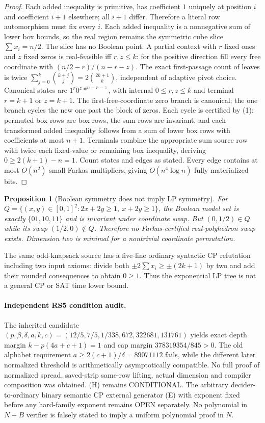 \documentclass[11pt]{article}
\newtheorem{proposition}[theorem]{Proposition}
\begin{document}
\begin{proof}
Each added inequality is primitive, has coefficient $1$ uniquely at position $i$ and coefficient $i+1$ elsewhere; all $i+1$ differ. Therefore a literal row automorphism must fix every $i$. Each added inequality is a nonnegative sum of lower box bounds, so the real region remains the symmetric cube slice $\sum x_i=n/2$. The slice has no Boolean point. A partial context with $r$ fixed ones and $z$ fixed zeros is real-feasible iff $r,z\le k$: for the positive direction fill every free coordinate with $(n/2-r)/(n-r-z)$. The exact first-passage count of leaves is twice $\sum_{j=0}^k\binom{k+j}{j}=2\binom{2k+1}{k}$, independent of adaptive pivot choice. Canonical states are $1^r0^z*^{n-r-z}$, with internal $0\le r,z\le k$ and terminal $r=k+1$ or $z=k+1$. The first-free-coordinate zero branch is canonical; the one branch cycles the new one past the block of zeros. Each cycle is certified by (1): permuted box rows are box rows, the sum rows are invariant, and each transformed added inequality follows from a sum of lower box rows with coefficients at most $n+1$. Terminals combine the appropriate sum source row with twice each fixed-value or remaining box inequality, deriving $0\ge 2(k+1)-n=1$. Count states and edges as stated. Every edge contains at most $O(n^2)$ small Farkas multipliers, giving $O(n^4\log n)$ fully materialized bits.
\end{proof}
\begin{proposition}[Boolean symmetry does not imply LP symmetry]
For $Q=\{(x,y)\in[0,1]^2:2x+2y\ge1,\ x+2y\ge1\}$, the Boolean model set is exactly $\{01,10,11\}$ and is invariant under coordinate swap. But $(0,1/2)\in Q$ while its swap $(1/2,0)\notin Q$. Therefore no Farkas-certified real-polyhedron swap exists. Dimension two is minimal for a nontrivial coordinate permutation.
\end{proposition}
The same odd-knapsack source has a five-line ordinary syntactic CP refutation including two input axioms: divide both $\pm2\sum x_i\ge\pm(2k+1)$ by two and add their rounded consequences to obtain $0\ge1$. Thus the exponential LP tree is not a general CP or SAT time lower bound.

\paragraph{Independent RS5 condition audit.}
The inherited candidate $(p,\beta,\delta,a,k,c)=(12/5,7/5,1/338,672,322681,131761)$ yields exact depth margin $k-p(4a+c+1)=1$ and cap margin $378319354/845>0$. The old alphabet requirement $a\ge2(c+1)/\delta=89071112$ fails, while the different later normalized threshold is arithmetically asymptotically compatible. No full proof of normalized spread, saved-strip same-row lifting, actual dimension and compiler composition was obtained. (H) remains CONDITIONAL. The arbitrary decider-to-ordinary binary semantic CP external generator (E) with exponent fixed before any hard-family exponent remains OPEN separately. No polynomial in $N+B$ verifier is falsely stated to imply a uniform polynomial proof in $N$.
\end{document}
